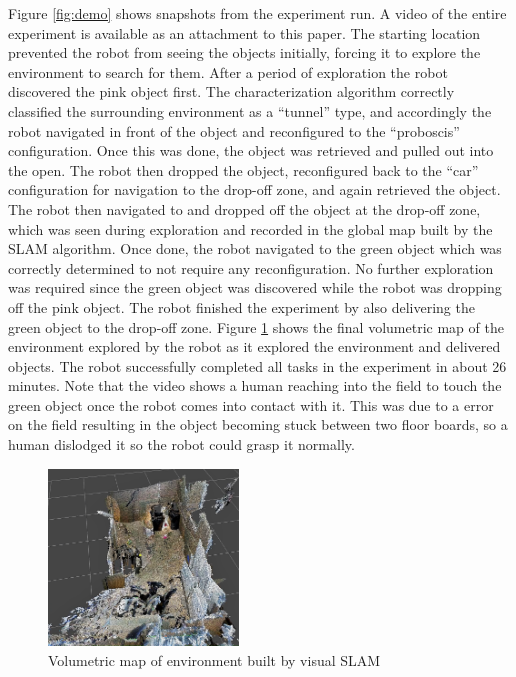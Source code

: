\documentclass[conference]{IEEEtran}
\begin{document}
Figure \ref{fig:demo} shows snapshots from the experiment run. A video of the entire experiment is available as an attachment to this paper. The starting location prevented the robot from seeing the objects initially, forcing it to explore the environment to search for them. After a period of exploration the robot discovered the pink object first. The characterization algorithm correctly classified the surrounding environment as a ``tunnel'' type, and accordingly the robot navigated in front of the object and reconfigured to the ``proboscis'' configuration. Once this was done, the object was retrieved and pulled out into the open. The robot then dropped the object, reconfigured back to the ``car'' configuration for navigation to the drop-off zone, and again retrieved the object. The robot then navigated to and dropped off the object at the drop-off zone, which was seen during exploration and recorded in the global map built by the SLAM algorithm. Once done, the robot navigated to the green object which was correctly determined to not require any reconfiguration. No further exploration was required since the green object was discovered while the robot was dropping off the pink object. The robot finished the experiment by also delivering the green object to the drop-off zone. Figure \ref{fig:octomap} shows the final volumetric map of the environment explored by the robot as it explored the environment and delivered objects. The robot successfully completed all tasks in the experiment in about 26 minutes. Note that the video shows a human reaching into the field to touch the green object once the robot comes into contact with it. This was due to a error on the field resulting in the object becoming stuck between two floor boards, so a human dislodged it so the robot could grasp it normally.


\begin{figure}
\begin{center}
\includegraphics[width=0.45\textwidth]{images/octomap.png}
\caption{Volumetric map of environment built by visual SLAM}
\label{fig:octomap}
\end{center}
\end{figure}
\end{document}
